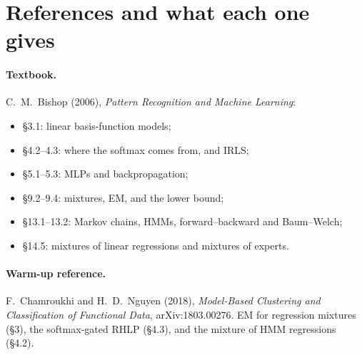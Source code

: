 \section{References and what each one gives}

\paragraph{Textbook.} C.~M.~Bishop (2006), \emph{Pattern Recognition and Machine Learning}:
\begin{itemize}
  \item \S3.1: linear basis-function models;
  \item \S4.2--4.3: where the softmax comes from, and IRLS;
  \item \S5.1--5.3: MLPs and backpropagation;
  \item \S9.2--9.4: mixtures, EM, and the lower bound;
  \item \S13.1--13.2: Markov chains, HMMs, forward--backward and Baum--Welch;
  \item \S14.5: mixtures of linear regressions and mixtures of experts.
\end{itemize}

\paragraph{Warm-up reference.} F.~Chamroukhi and H.~D.~Nguyen (2018), \emph{Model-Based Clustering and Classification of Functional Data}, arXiv:1803.00276. EM for regression mixtures (\S3), the softmax-gated RHLP (\S4.3), and the mixture of HMM regressions (\S4.2).

